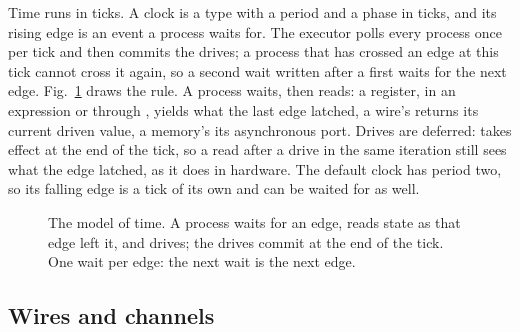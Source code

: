 \documentclass[journal,9pt]{IEEEtran}
\begin{document}
Time runs in ticks. A clock is a type with a period and a phase in
ticks, and its rising edge is an event a process waits for. The
executor polls every process once per tick and then commits the
drives; a process that has crossed an edge at this tick cannot cross
it again, so a second wait written after a first waits for the next
edge. Fig.~\ref{fig:p-time} draws the rule. A process waits, then
reads: a register, in an expression or through , yields what
the last edge latched, a wire's  returns its current driven value, a
memory's  its
asynchronous port. Drives are deferred:  takes effect at the
end of the tick, so a read after a drive in the same iteration still
sees what the edge latched, as it does in hardware. The default clock
has period two, so its falling edge is a tick of its own and can be
waited for as well.

\begin{figure}[htbp]
\centering
{}
\caption{The model of time. A process waits for an edge, reads state
as that edge left it, and drives; the drives commit at the end of the
tick. One wait per edge: the next wait is the next edge.}
\label{fig:p-time}
\end{figure}

\subsection{Wires and channels}
\end{document}
